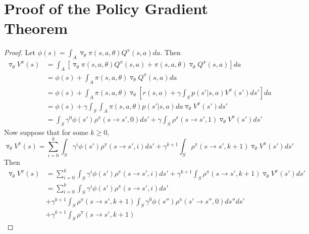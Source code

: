 \documentclass[11pt]{article}
\theoremstyle{definition}
\begin{document}

\appendix
\section{Proof of the Policy Gradient Theorem}
\begin{proof} \label{PGTProof}
Let $\phi(s) = \int_A \triangledown_{\theta} \pi(s,a,\theta) Q^{\pi}(s,a) da$. Then
\begin{equation}
\begin{split}
\triangledown_{\theta} V^{\pi} (s) &= \int_A \left[ \triangledown_{\theta} \pi (s,a,\theta) Q^{\pi}(s,a) + \pi(s,a,\theta) \triangledown_{\theta} Q^{\pi}(s,a) \right] da \\
&= \phi(s) + \int_A \pi(s,a,\theta) \triangledown_{\theta} Q^{\pi}(s,a) da
\\
&= \phi(s) + \int_A \pi(s,a,\theta) \triangledown_{\theta} \left[r(s,a) + \gamma \int_S p(s'|s,a) V^{\pi}(s') ds' \right] da
\\
&= \phi(s) + \gamma \int_S \int_A \pi(s,a,\theta)p(s'|s,a)da \triangledown_{\theta}V^{\pi}(s')ds'
\\
&= \int_S \gamma^0 \phi(s') \rho^{\pi}(s \rightarrow s',0)ds' + \gamma \int_S \rho^{\pi}(s \rightarrow s', 1) \triangledown_{\theta} V^{\pi} (s') ds'
\end{split}
\end{equation}
Now suppose that for some $k \ge 0$,
\begin{equation}
\triangledown_{\theta}V^{\pi}(s) = \sum_{i=0}^k \int_S \gamma^i \phi(s') \rho^{\pi}(s \rightarrow s',i)ds' + \gamma^{k+1} \int_S \rho^{\pi}(s \rightarrow s',k+1) \triangledown_{\theta} V^{\pi}(s')ds'
\end{equation}
Then
\begin{equation}
\begin{split}
\triangledown_{\theta}V^{\pi}(s) &= \sum_{i=0}^k \int_S \gamma^i \phi(s') \rho^{\pi}(s \rightarrow s',i)ds' + \gamma^{k+1} \int_S \rho^{\pi}(s \rightarrow s',k+1) \triangledown_{\theta} V^{\pi}(s')ds'
\\
&= \sum_{i=0}^k \int_S \gamma^i \phi(s') \rho^{\pi}(s \rightarrow s',i)ds'
\\
&+ \gamma^{k+1} \int_S \rho^{\pi}(s \rightarrow s',k+1) 
  \int_S \gamma^0 \phi(s'') \rho^{\pi}(s' \rightarrow s'',0)ds''
ds' \\
&+ \gamma^{k+1} \int_S \rho^{\pi}(s \rightarrow s',k+1)

\end{split}
\end{equation}
\end{proof}
\end{document}
